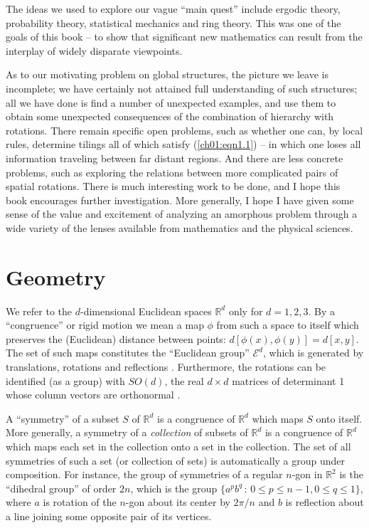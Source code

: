 \documentclass[reqno]{stml-l}
\theoremstyle{plain}
\theoremstyle{definition}
\numberwithin{equation}{chapter}
\begin{document}
The ideas we used to explore our vague ``main quest'' include ergodic theory, probability theory, statistical mechanics and ring theory. This was one of the goals of this book -- to show that significant new mathematics can result from the interplay of widely disparate viewpoints.

As to our motivating problem on global structures, the picture we leave is incomplete; we have certainly not attained full understanding of such structures; all we have done is find a number of unexpected examples, and use them to obtain some unexpected consequences of the combination of hierarchy with rotations. There remain specific open problems, such as whether one can, by local rules, determine tilings all of which satisfy (\ref{ch01:eqn1.1}) -- in which one loses all information traveling between far distant regions. And there are less concrete
problems, such as exploring the relations between more complicated pairs of spatial rotations. There is much interesting work to be done, and I hope this book encourages further investigation. More generally, I hope I have given some sense of the value and excitement of analyzing an amorphous problem through a wide variety of the lenses available from mathematics and the physical sciences.


\appendix

\renewcommand{\thechapter}{\Roman{chapter}}

\chapter{Geometry}\label{appI:appI}

We refer to the $d$-dimensional Euclidean spaces $\mathbb{R}^{d}$ only for $d=1,2,3$. By a ``congruence'' or rigid motion we mean a map $\phi$ from such a space to itself which preserves the (Euclidean) distance between points: $d[\phi(x), \phi(y)]=d[x, y]$. The set of such maps constitutes the ``Euclidean group'' $\mathcal{E}^{d}$, which is generated by translations, rotations and reflections \cite[p. 121]{bib:NiS}. Furthermore, the rotations can be identified (as a group) with $SO(d)$, the real $d\times d$ matrices of determinant 1 whose column vectors are orthonormal \cite[p. 11]{bib:Ree}.

A ``symmetry'' of a subset $S$ of $\mathbb{R}^{d}$ is a congruence of $\mathbb{R}^{d}$ which maps $S$ onto itself. More generally, a symmetry of a \emph{collection} of subsets of $\mathbb{R}^{d}$ is a congruence of $\mathbb{R}^{d}$ which maps each set in the collection onto a set in the collection. The set of all symmetries of such a set (or collection of sets) is automatically a group under composition. For instance, the group of symmetries of a regular $n$-gon in $\mathbb{R}^{2}$ is the ``dihedral group'' of order $2n$, which is the group $\{a^{p}b^{q}\,:\,0\leq p\leq n-1,0\leq q\leq 1\}$, where $a$ is rotation of the $n$-gon about its center by $2\pi/n$ and $b$ is reflection about a line joining some opposite pair of its vertices.
\end{document}
